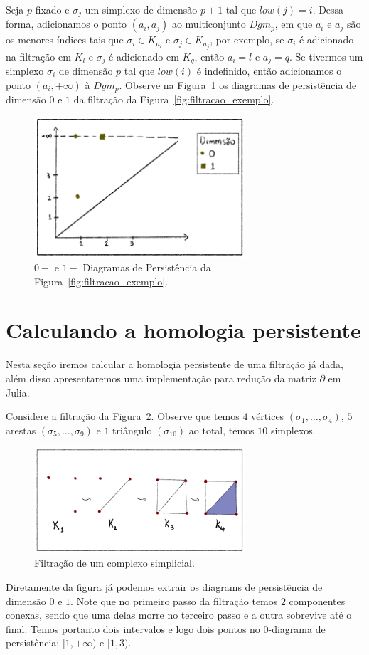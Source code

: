 Seja $p$ fixado e $\sigma_j$ um simplexo de dimensão $p+1$ tal que $low(j)=i$.
Dessa forma, adicionamos o ponto $(a_i, a_j)$ ao multiconjunto $Dgm_p$, em que
$a_i$ e $a_j$ são os menores índices tais que $\sigma_i \in K_{a_i}$ e $\sigma_j
\in K_{a_j}$, por exemplo, se $\sigma_i$ é adicionado na filtração em $K_l$ e
$\sigma_j$ é adicionado em $K_q$, então $a_i = l$ e $a_j = q$. Se tivermos um
simplexo $\sigma_i$ de dimensão $p$ tal que $low(i)$ é indefinido, então
adicionamos o ponto $(a_i, +\infty)$ à $Dgm_p$. Observe na Figura~\ref{fig:ex_dgm}
os diagramas de persistência de dimensão $0$ e $1$ da filtração da Figura~\ref{fig:filtracao_exemplo}.
\begin{figure}[!htpb]
  \centering
  \includegraphics[width=0.7\textwidth]{images/ex_dgm.png}
  \caption{$0-$ e $1-$ Diagramas de Persistência da Figura~\ref{fig:filtracao_exemplo}.}
  \label{fig:ex_dgm}
  \fautor
\end{figure}

\section{Calculando a homologia persistente}
Nesta seção iremos calcular a homologia persistente de uma filtração já dada,
além disso apresentaremos uma implementação para redução da matriz $\partial$
em Julia.

Considere a filtração da Figura~\ref{fig:fil_ph}. Observe que temos $4$ vértices
$(\sigma_1,\dots,\sigma_4)$, $5$ arestas $(\sigma_5,\dots,\sigma_9)$
e $1$ triângulo $(\sigma_{10})$ ao total, temos $10$ simplexos.
\begin{figure}[bht]
  \centering
  \includegraphics[width=0.7\textwidth]{images/fil_ph.png}
  \caption{Filtração de um complexo simplicial.}
  \label{fig:fil_ph}
  \fautor
\end{figure}
Diretamente da figura já podemos extrair os diagrams de persistência de dimensão
$0$ e $1$. Note que no primeiro passo da filtração temos $2$ componentes conexas,
sendo que uma delas morre no terceiro passo e a outra sobrevive até o final.
Temos portanto dois intervalos e logo dois  pontos no $0$-diagrama de persistência:
$[1,+\infty)$ e $[1,3)$.


